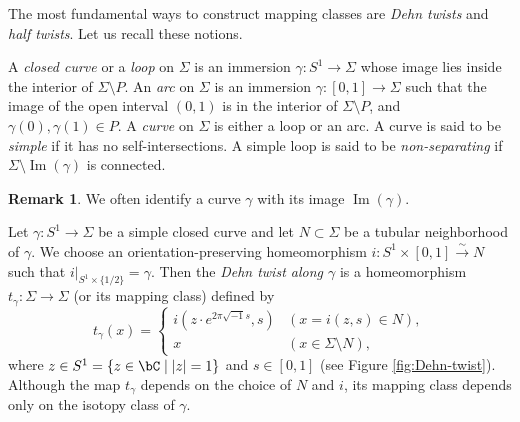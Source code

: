 \documentclass{amsart}
\numberwithin{equation}{section}
\theoremstyle{plain}
\theoremstyle{definition}
\newtheorem{remark}[theorem]{Remark}
\DeclareMathOperator{\Image}{\mathrm{Im}}
\begin{document}
The most fundamental ways to construct mapping classes are \emph{Dehn twists} and \emph{half twists}.
Let us recall these notions.

A \emph{closed curve} or a \emph{loop} on $\Sigma$ is an immersion $\gamma \colon S^1 \to \Sigma$ whose image lies inside the interior of $\Sigma \setminus P$.
An \emph{arc} on $\Sigma$ is an immersion $\gamma \colon [0, 1] \to \Sigma$ such that the image of the open interval $(0, 1)$ is in the interior of $\Sigma \setminus P$, and $\gamma(0), \gamma(1) \in P$.
A \emph{curve} on $\Sigma$ is either a loop or an arc.
A curve is said to be \emph{simple} if it has no self-intersections.
A simple loop is said to be \emph{non-separating} if $\Sigma \setminus \Image(\gamma)$ is connected.

\begin{remark}
    We often identify a curve $\gamma$ with its image $\Image(\gamma)$.
\end{remark}


Let $\gamma \colon S^1 \to \Sigma$ be a simple closed curve and let $N \subset \Sigma$ be a tubular neighborhood of $\gamma$.
We choose an orientation-preserving homeomorphism $i \colon S^1 \times [0, 1]\xrightarrow{\sim} N$ such that $i \vert_{S^1 \times \{1/2\} } = \gamma$.
Then the \emph{Dehn twist along $\gamma$} is a homeomorphism $t_\gamma \colon \Sigma \to \Sigma$ (or its mapping class) defined by
\begin{equation}
    t_\gamma(x) =
    \begin{cases}
        i(z \cdot e^{2\pi \sqrt{-1} s}, s) & (x = i(z, s) \in N),        \\
        x                                  & (x \in \Sigma \setminus N),
    \end{cases}
\end{equation}
where $z \in S^1 = \{z \in \bC \mid |z| = 1\}$ and $s \in [0, 1]$ (see Figure \ref{fig:Dehn-twist}).
Although the map $t_\gamma$ depends on the choice of $N$ and $i$, its mapping class depends only on the isotopy class of $\gamma$.
\end{document}
